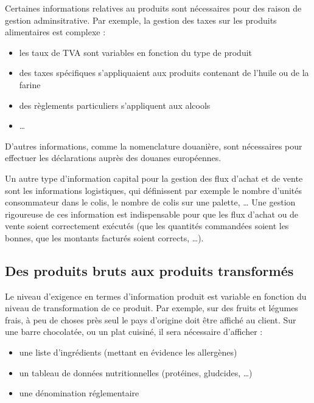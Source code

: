                 Certaines informations relatives au produits sont nécessaires pour des raison de gestion adminsitrative.
                Par exemple, la gestion des taxes sur les produits alimentaires est complexe : 
                \begin{itemize}
                    \item les taux de TVA sont variables en fonction du type de produit
                    \item des taxes spécifiques s'appliquaient aux produits contenant de l'huile ou de la farine
                    \item des règlements particuliers s'appliquent aux alcools
                    \item \dots
                \end{itemize}
                D'autres informations, comme la nomenclature douanière, sont nécessaires pour effectuer les déclarations auprès des douanes européennes.

                Un autre type d'information capital pour la gestion des flux d'achat et de vente sont les informations logistiques, qui définissent par exemple le nombre d'unités consommateur dans le colis, le nombre de colis sur une palette, \dots
                Une gestion rigoureuse de ces information est indispensable pour que les flux d'achat ou de vente soient correctement exécutés (que les quantités commandées soient les bonnes, que les montants facturés soient corrects, \dots).

            \subsection{Des produits bruts aux produits transformés}

            Le niveau d'exigence en termes d'information produit est variable en fonction du niveau de transformation de ce produit.
            Par exemple, sur des fruits et légumes frais, à peu de choses près seul le pays d'origine doit être affiché au client.
            Sur une barre chocolatée, ou un plat cuisiné, il sera nécessaire d'afficher :
            \begin{itemize}
                 \item une liste d'ingrédients (mettant en évidence les allergènes)
                 \item un tableau de données nutritionnelles (protéines, gludcides, \dots)
                 \item une dénomination réglementaire
            \end{itemize}

